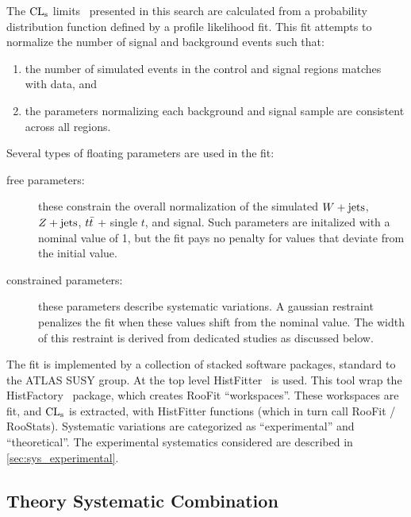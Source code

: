 The $\mathrm{CL}_{\mathrm{s}}$ limits~\cite{Read:2002hq} presented in this search are calculated
from a probability distribution function defined by a
 profile likelihood
fit. This fit attempts to normalize the number of signal and background
events such that:
\begin{enumerate}
\item the number of simulated events in the control and signal regions
  matches with data, and
\item the parameters normalizing each background and signal sample are
  consistent across all regions.
\end{enumerate}
Several types of floating parameters are used in the fit:
\begin{description}
\item[free parameters:] these constrain the
  overall normalization of the simulated $W + \text{jets}$,
  $Z + \text{jets}$, $t \bar{t}$ + single $t$, and
  signal. Such parameters are initalized with a nominal value of 1,
  but the fit pays no penalty for values that deviate from the initial
  value.
\item[constrained parameters:] these
  parameters describe systematic variations. A gaussian restraint
  penalizes the fit when these values shift from the nominal
  value. The width of this restraint is derived from dedicated
  studies as discussed below.
\end{description}

The fit is implemented by a collection of stacked software packages,
standard to the ATLAS SUSY group. At the top level
HistFitter~\cite{histfitter} is used. This tool wrap the
HistFactory~\cite{histfactory} package, which creates RooFit
``workspaces''. These workspaces are fit, and $\mathrm{CL}_{\mathrm{s}}$ is extracted, with
HistFitter functions (which in turn call RooFit /
RooStats). Systematic variations are categorized as ``experimental''
and ``theoretical''. The experimental systematics considered are described in \cref{sec:sys_experimental}.

\subsection{Theory Systematic Combination}

